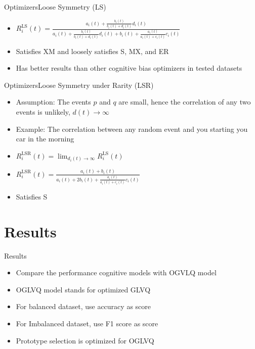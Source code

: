 \documentclass[
	aspectratio=169,	%
	onlytextwidth,		%
	t,					%
	]{beamer}
\begin{document}
	\begin{frame}[fragile]{Optimizers}{Loose Symmetry (LS)}

		\begin{itemize}
			
		\item<1-> $R^{\text{LS}}_{i}(t) = \frac{a_{i}(t) 
		+ \frac{b_{i}(t)}{b_{i}(t) + d_{i}(t)}d_{i}(t)}
		{a_{i}(t) 
		+ \frac{b_{i}(t)}{b_{i}(t) + d_{i}(t)}d_{i}(t) 
		+ b_{i}(t) 
		+ \frac{a_{i}(t)}{a_{i}(t) + c_{i}(t)}c_{i}(t)}$~\cite{tak10, man21} 
		\vspace{10pt}
		\item<2-> Satisfies XM and loosely satisfies S, MX, and ER~\cite{tak10}
		\item <3-> Has better results than other cognitive bias optimizers in tested datasets~\cite{tak10} 
		\end{itemize}
	\end{frame}

	\begin{frame}[fragile]{Optimizers}{Loose Symmetry under Rarity (LSR)}

		\begin{itemize}

		\item<1-> Assumption: The events $p$ and $q$ are small, hence the correlation of any two events is unlikely, $d(t) \rightarrow \infty$~\cite{hat07}
		\item <2-> Example: The correlation between any random event and you starting you car in the morning~\cite{hat07}
		\item<3-> $R^{\text{LSR}}_{i}(t) = \lim_{d_{i}(t) \to \infty}R^{\text{LS}}_{i}(t)$
		\vspace{10pt}
		\item<4-> $R^{\text{LSR}}_{i}(t) = \frac{a_{i}(t) 
		+ b_{i}(t)}
		{a_{i}(t) 
		+ 2b_{i}(t) 
		+ \frac{a_{i}(t)}{a_{i}(t) + c_{i}(t)}c_{i}(t)}$~\cite{tak10}
		\vspace{10pt}
		\item<5-> Satisfies S~\cite{tak10}
		\end{itemize}
	\end{frame}
	\section{Results}

	\begin{frame}[fragile]{Results}

		\begin{itemize}

		\item<1-> Compare the performance cognitive models with OGVLQ model
		\item<2-> OGLVQ model stands for optimized GLVQ~\cite{OGLVQ}
		\item<3-> For balanced dataset, use accuracy as score
		\item<4-> For Imbalanced dataset, use F1 score as score
		\item <5-> Prototype selection is optimized for OGLVQ
		\end{itemize}
	\end{frame}
	
\end{document}
